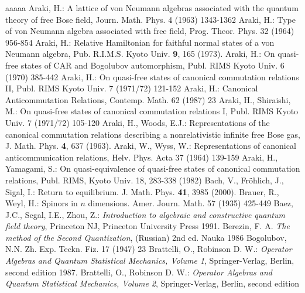 \documentclass{svmult}
\begin{document}
\begin{remark}
\begin{thebibliography}{aaaaa}
 Araki, H.: A lattice of von Neumann  algebras associated
  with the quantum theory of free Bose field, Journ. Math. Phys. 4 (1963)
  1343-1362 
 Araki, H.: Type of von Neumann algebra associated with free
  field, Prog. Theor. Phys. 32 (1964) 956-854
 Araki, H.: Relative Hamiltonian for faithful normal
states of a von Neumann algebra, Pub. R.I.M.S. Kyoto Univ. {\bf 9}, 165
(1973).
 Araki, H.: On quasi-free states of CAR and Bogolubov
  automorphism, Publ. RIMS Kyoto Univ. 6 (1970) 385-442
  Araki, H.: On quasi-free states of canonical commutation
  relations II, Publ. RIMS Kyoto Univ. 7 (1971/72) 121-152
 Araki, H.: Canonical Anticommutation Relations,
Contemp. Math. 62 (1987) 23
 Araki, H., Shiraishi, M.:
 On quasi-free states of canonical commutation
  relations I, Publ. RIMS Kyoto Univ. 7 (1971/72) 105-120
 Araki, H., Woods, E.J.: Representations of the canonical 
commutation relations describing a nonrelativistic infinite free 
Bose gas, J. Math. Phys. {\bf 4}, 637 (1963). 
 Araki, W., Wyss, W.: Representations of canonical
  anticommunication relations, Helv. Phys. Acta 37 (1964) 139-159
 Araki, H., Yamagami, S.:
On quasi-equivalence of quasi-free states of canonical commutation relations,
Publ. RIMS, Kyoto Univ. 18, 283-338 (1982)
 Bach, V., Fr\"ohlich, J., Sigal, I.: Return to 
equilibrium. J. Math. Phys. {\bf 41}, 3985 (2000).
 Brauer, R., Weyl, H.: Spinors in $n$
  dimensions. Amer. Journ. Math. 57 (1935) 425-449
 Baez, J.C., Segal, I.E., Zhou, Z.: {\em 
Introduction to algebraic and constructive quantum field theory}, 
Princeton NJ, Princeton University Press 1991. 
Berezin, F. A. {\em The method of the Second
Quantization}, (Russian)
2nd ed. Nauka 1986
Bogolubov, N.N. Zh. Exp. Teckn. Fiz. 17 (1947) 23
 Brattelli, O., Robinson D. W.: {\it Operator Algebras and
Quantum Statistical Mechanics, Volume 1}, Springer-Verlag, Berlin, second 
edition  1987.
 Brattelli, O., Robinson D. W.: {\it Operator Algebras and
Quantum Statistical Mechanics, Volume 2}, Springer-Verlag, Berlin, second  edition 

\end{thebibliography}
\end{remark}
\end{document}

